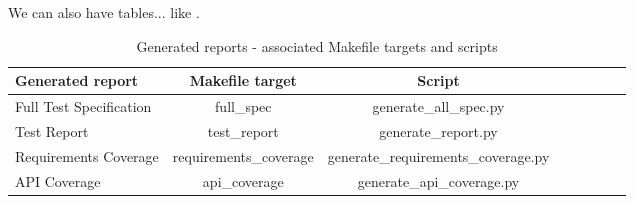 We can also have tables... like .

\begin{center}
\begin{table}[htb]
  \caption{Generated reports - associated Makefile targets and scripts}
  \begin{tabular}{l*{6}{c}r}
    Generated report & Makefile target & Script \\
    \hline
    Full Test Specification & full_spec & generate_all_spec.py  \\
    Test Report & test_report & generate_report.py  \\
    Requirements Coverage & requirements_coverage &
    generate_requirements_coverage.py   \\
    API Coverage & api_coverage & generate_api_coverage.py  \\
  \end{tabular}
  \label{table:reports}
\end{table}
\end{center}